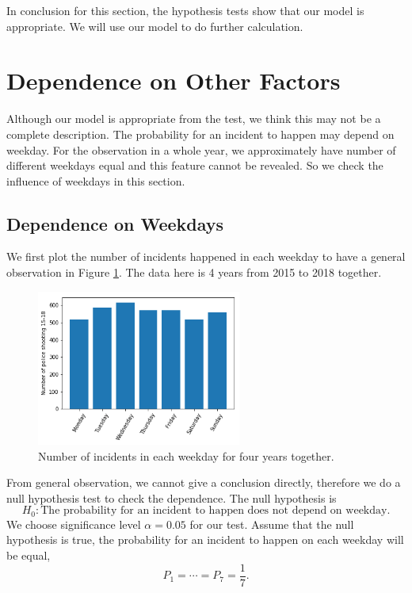 \documentclass[11pt,a4paper,english]{article}
\begin{document}
In conclusion for this section, the hypothesis tests show that our model is appropriate. We will use our model to do further calculation.

\section{Dependence on Other Factors}
Although our model is appropriate from the test, we think this may not be a complete description. 
The probability for an incident to happen may depend on weekday. For the observation in a whole year, we approximately have number of different weekdays equal and this feature cannot be revealed.
So we check the influence of weekdays in this section.

\subsection{Dependence on Weekdays}
We first plot the number of incidents happened in each weekday to have a general observation in Figure \ref{fig:weekdays}. The data here is 4 years from 2015 to 2018 together.
\begin{figure}[htbp]
	\centering
	\includegraphics[width=0.6\textwidth]{weekdays.png}
	\caption{Number of incidents in each weekday for four years together.}
	\label{fig:weekdays}
\end{figure}
From general observation, we cannot give a conclusion directly,
therefore we do a null hypothesis test to check the dependence.
The null hypothesis is
\begin{equation*}
	H_{0}:
	\text{The probability for an incident to happen does not depend on weekday.}
\end{equation*} 
We choose significance level $\alpha = 0.05$ for our test.
Assume that the null hypothesis is true, the probability for an incident to happen on each weekday will be equal,
\begin{equation*}
	P_{1} = \cdots = P_{7} = \frac{1}{7}.
\end{equation*}
\end{document}
